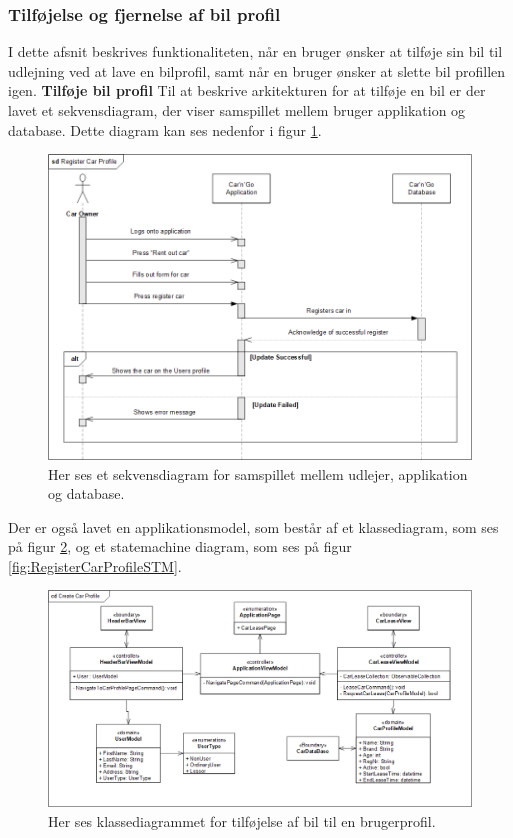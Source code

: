 \documentclass[Arkitektur/System_main.tex]{subfiles}
\begin{document}
\subsubsection{Tilføjelse og fjernelse af bil profil}
I dette afsnit beskrives funktionaliteten, når en bruger ønsker at tilføje sin bil til udlejning ved at lave en bilprofil, samt når en bruger ønsker at slette bil profillen igen.
\textbf{Tilføje bil profil}
Til at beskrive arkitekturen for at tilføje en bil er der lavet et sekvensdiagram, der viser samspillet mellem bruger applikation og database. Dette diagram kan ses nedenfor i figur \ref{fig:RegisterCarProfileSD}.
\begin{figure}[H]
    \centering
    \includegraphics[width=1\textwidth]{Arkitektur/Softwarearkitektur/Car_registration/graphics/RegisterCarSD.png}
    \caption{Her ses et sekvensdiagram for samspillet mellem udlejer, applikation og database. }
    \label{fig:RegisterCarProfileSD}
\end{figure}
Der er også lavet en applikationsmodel, som består af et klassediagram, som ses på figur \ref{fig:RegisterCarProfileCD}, og et statemachine diagram, som ses på figur \ref{fig:RegisterCarProfileSTM}.
\begin{figure}[H]
    \centering
    \includegraphics[width=1\textwidth]{Arkitektur/Softwarearkitektur/Car_registration/graphics/RegisterCarProfileCD.png}
    \caption{Her ses klassediagrammet for tilføjelse af bil til en brugerprofil. }
    \label{fig:RegisterCarProfileCD}
\end{figure}
\end{document}
